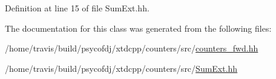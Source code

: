 Definition at line 15 of file Sum\-Ext.\-hh.



The documentation for this class was generated from the following files\-:\begin{DoxyCompactItemize}
\item 
/home/travis/build/psycofdj/xtdcpp/counters/src/\hyperlink{counters__fwd_8hh}{counters\-\_\-fwd.\-hh}\item 
/home/travis/build/psycofdj/xtdcpp/counters/src/\hyperlink{SumExt_8hh}{Sum\-Ext.\-hh}\end{DoxyCompactItemize}
